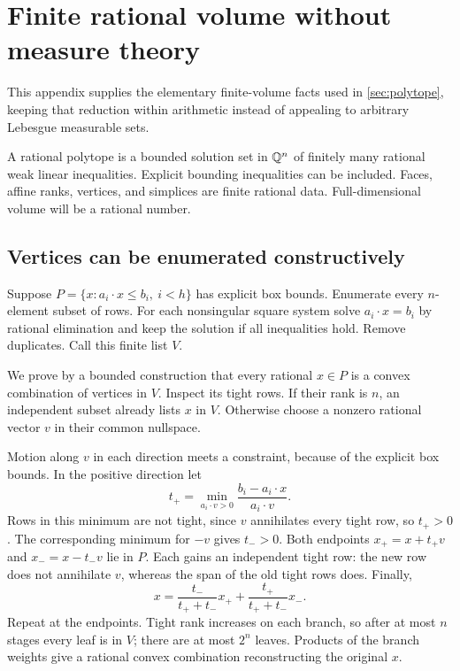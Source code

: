 \section{Finite rational volume without measure theory}\label{app:volume}

This appendix supplies the elementary finite-volume
facts used in \cref{sec:polytope}, keeping that
reduction within arithmetic instead of appealing
to arbitrary Lebesgue measurable sets.

A rational polytope is a bounded solution set in
\(\mathbb Q^n\) of finitely many rational weak linear
inequalities. Explicit bounding inequalities can
be included. Faces, affine ranks, vertices, and
simplices are finite rational data.
Full-dimensional volume will be a rational number.

\subsection{Vertices can be enumerated constructively}

Suppose \(P=\{x:a_i\cdot x\leq b_i,\ i<h\}\)
has explicit box bounds. Enumerate every
\(n\)-element subset of rows. For each nonsingular
square system solve \(a_i\cdot x=b_i\) by rational
elimination and keep the solution if all
inequalities hold. Remove duplicates. Call this
finite list \(V\).

We prove by a bounded construction that every
rational \(x\in P\) is a convex combination of
vertices in \(V\). Inspect its tight rows.
If their rank is \(n\), an independent subset
already lists \(x\) in \(V\). Otherwise choose
a nonzero rational vector \(v\) in their common
nullspace.

Motion along \(v\) in each direction meets a
constraint, because of the explicit box bounds.
In the positive direction let
\[
 t_+=\min_{a_i\cdot v>0}
           \frac{b_i-a_i\cdot x}{a_i\cdot v}.
\]
Rows in this minimum are not tight, since \(v\)
annihilates every tight row, so \(t_+>0\).
The corresponding minimum for \(-v\) gives
\(t_->0\). Both endpoints
\(x_+=x+t_+v\) and \(x_-=x-t_-v\) lie in \(P\).
Each gains an independent tight row: the new row
does not annihilate \(v\), whereas the span of
the old tight rows does. Finally,
\[
 x=\frac{t_-}{t_++t_-}x_+
        +\frac{t_+}{t_++t_-}x_-.
\]
Repeat at the endpoints. Tight rank increases
on each branch, so after at most \(n\) stages
every leaf is in \(V\); there are at most
\(2^n\) leaves. Products of the branch weights
give a rational convex combination reconstructing
the original \(x\).

